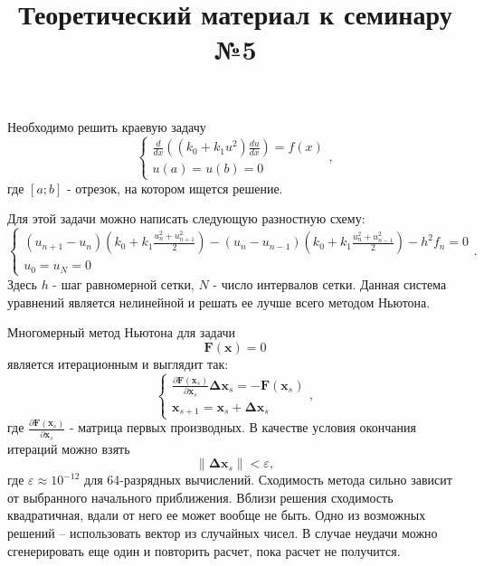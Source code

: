 \documentclass{article}
\title{Теоретический материал к семинару №5}
\date{}
\begin{document}
\maketitle

Необходимо решить краевую задачу
\begin{equation} \label{c5eq1}
	\begin{cases}
		 \displaystyle \frac{d}{dx} \left( \left( k_0 + k_1 u^2 \right) \frac{du}{dx} \right) = f(x) \\
		u(a) = u(b) = 0
	\end{cases},
\end{equation}
где $[a; b]$ - отрезок, на котором ищется решение.

Для этой задачи можно написать следующую разностную схему:
\begin{equation} \label{c5eq2}
	\begin{cases}
		\displaystyle \left( u_{n+1} - u_n \right) \left( k_0 + k_1 \frac{u_n^2 + u_{n+1}^2}{2} \right) - \left( u_n - u_{n-1} \right) \left( k_0 + k_1 \frac{u_n^2 + u_{n-1}^2}{2} \right) - h^2 f_n = 0 \\
		u_0 = u_N = 0
	\end{cases}.
\end{equation}
Здесь $h$ - шаг равномерной сетки, $N$ - число интервалов сетки. Данная система уравнений является нелинейной и решать ее лучше всего методом Ньютона.

Многомерный метод Ньютона для задачи
\begin{equation} \label{c5eq3}
	\mathbf{F}(\mathbf{x}) = 0
\end{equation}
является итерационным и выглядит так:
\begin{equation} \label{c5eq4}
	\begin{cases}
		\displaystyle \frac{\partial \mathbf{F}(\mathbf{x}_s)}{\partial \mathbf{x}_s}  \mathbf{\Delta x}_s = -\mathbf{F}(\mathbf{x}_s)\\
		\mathbf{x}_{s+1} = \mathbf{x}_s + \mathbf{\Delta x}_s
	\end{cases},
\end{equation}
где $\displaystyle \frac{\partial \mathbf{F}(\mathbf{x}_s)}{\partial \mathbf{x}_s}$ - матрица первых производных. В качестве условия окончания итераций можно взять
\begin{equation} \label{c5eq5}
	\|\mathbf{\Delta x}_s\| < \varepsilon,
\end{equation}
где $\varepsilon \approx 10^{-12}$ для 64-разрядных вычислений. Сходимость метода сильно зависит от выбранного начального приближения. Вблизи решения сходимость квадратичная, вдали от него ее может вообще не быть. Одно из возможных решений – использовать вектор из случайных чисел. В случае неудачи можно сгенерировать еще один и повторить расчет, пока расчет не получится.
\end{document}
